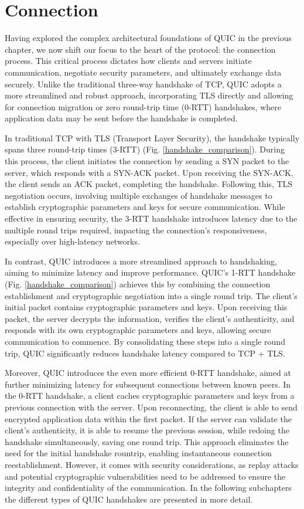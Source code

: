 \section{Connection}

Having explored the complex architectural foundations of QUIC in the previous chapter, we now shift our focus to the heart of the
protocol: the connection process. This critical process dictates how clients and servers initiate communication, negotiate security
parameters, and ultimately exchange data securely. Unlike the traditional three-way handshake of TCP, QUIC adopts a more streamlined
and robust approach, incorporating TLS directly and allowing for connection migration or zero round-trip time (0-RTT) handshakes, where
application data may be sent before the handshake is completed.

In traditional TCP with TLS (Transport Layer Security), the handshake typically spans three round-trip times (3-RTT)
(Fig. \ref{handshake_comparison}). During this process, the client initiates the connection by sending a SYN packet to the server,
which responds with a SYN-ACK packet. Upon receiving the SYN-ACK, the client sends an ACK packet, completing the handshake.
Following this, TLS negotiation occurs, involving multiple exchanges of handshake messages to establish cryptographic parameters
and keys for secure communication. While effective in ensuring security, the 3-RTT handshake introduces latency due to the multiple
round trips required, impacting the connection's responsiveness, especially over high-latency networks.

In contrast, QUIC introduces a more streamlined approach to handshaking, aiming to minimize latency and improve performance.
QUIC's 1-RTT handshake (Fig. \ref{handshake_comparison}) achieves this by combining the connection establishment and cryptographic
negotiation into a single round trip. The client's initial packet contains cryptographic parameters and keys. Upon receiving this
packet, the server decrypts the information, verifies the client's authenticity, and responds with its own cryptographic parameters
and keys, allowing secure communication to commence. By consolidating these steps into a single round trip, QUIC significantly
reduces handshake latency compared to TCP + TLS.

Moreover, QUIC introduces the even more efficient 0-RTT handshake, aimed at further minimizing latency for subsequent connections
between known peers. In the 0-RTT handshake, a client caches cryptographic parameters and keys from a previous connection with the
server. Upon reconnecting, the client is able to send encrypted application data within the first packet. If the server can
validate the client's authenticity, it is able to resume the previous session, while redoing the handshake simultaneously, saving one
round trip. This approach eliminates the need for the initial handshake rountrip, enabling instantaneous connection reestablishment. 
However, it comes with security considerations, as replay attacks and potential cryptographic vulnerabilities need to be addressed
to ensure the integrity and confidentiality of the communication. In the following subchapters the different types of QUIC handshakes
are presented in more detail.

